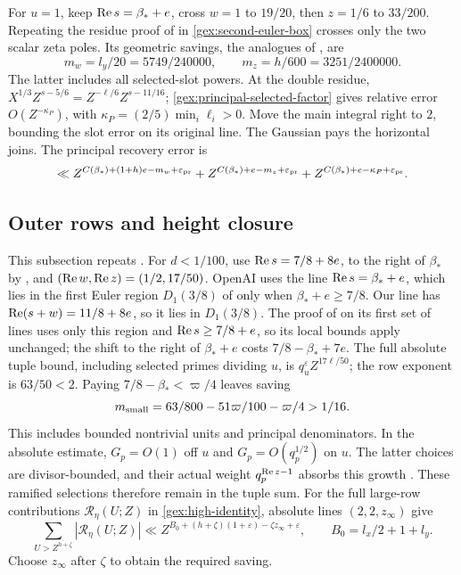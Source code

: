 For \(u=1\), keep \(\operatorname{Re} s=\beta_*+e\), cross \(w=1\) to
\(19/20\), then \(z=1/6\) to \(33/200\).
Repeating the residue proof of \cite[Lemma 10.5]{OAI26} in
\eqref{gex:second-euler-box} crosses only the two scalar zeta poles.
Its geometric savings, the analogues of \cite[(20.3)]{OAI26}, are
\[
 m_w=l_y/20=5749/240000,\qquad
 m_z=h/600=3251/2400000.
\]
The latter includes all selected-slot powers.
At the double residue,
\(X^{1/3}Z^{s-5/6}=Z^{-\ell/6}Z^{s-11/16}\);
\eqref{gex:principal-selected-factor} gives relative error
\(O(Z^{-\kappa_P})\), with
\(\kappa_P=(2/5)\min_i\ell_i>0\).
Move the main integral right to \(2\), bounding the slot error
on its original line. The Gaussian pays the horizontal joins.
The principal recovery error is
\begin{equation}\label{gex:principal-recovery-error}
 \ll Z^{C(\beta_*)+(1+h)e-m_w+\varepsilon_{\rm pr}}
 +Z^{C(\beta_*)+e-m_z+\varepsilon_{\rm pr}}
 +Z^{C(\beta_*)+e-\kappa_P+\varepsilon_{\rm pr}}.
\end{equation}

\subsection{Outer rows and height closure}

This subsection repeats \cite[Lemma 10.6 and Section 20.3]{OAI26}.
For \(d<1/100\), use \(\operatorname{Re} s=7/8+8e\), to the right of
\(\beta_*\) by \cite[Theorem~1.1]{OAI26}, and
\((\operatorname{Re} w,\operatorname{Re} z)=(1/2,17/50)\). OpenAI uses the line
\(\operatorname{Re} s=\beta_*+e\), which lies in the first Euler region
\(D_1(3/8)\) of \cite[Section 10.2]{OAI26} only when
\(\beta_*+e\ge7/8\). Our line has \(\operatorname{Re}(s+w)=11/8+8e\), so it lies in
\(D_1(3/8)\). The proof of \cite[Lemma 16.2]{OAI26} on its first set
of lines uses only this region and \(\operatorname{Re} s\ge7/8+e\), so its local
bounds apply unchanged; the shift to the right of \(\beta_*+e\) costs
\(7/8-\beta_*+7e\).
The full absolute tuple bound, including selected primes dividing
\(u\), is \(q_u^\varepsilon Z^{17\ell/50}\); the row exponent
is \(63/50<2\). Paying \(7/8-\beta_*<\varpi/4\) leaves saving
\[
 m_{\rm small}=63/800-51\varpi/100-\varpi/4>1/16.
\]
This includes bounded nontrivial units and principal denominators.
In the absolute estimate, \(G_p=O(1)\) off \(u\) and
\(G_p=O(q_p^{1/2})\) on \(u\). The latter choices are
divisor-bounded, and their actual weight
\(q_p^{\operatorname{Re} z-1}\) absorbs this growth
\cite[Lemma 16.2]{OAI26}. These ramified selections therefore
remain in the tuple sum.
For the full large-row contributions \(\mathscr R_\eta(U;Z)\)
in \eqref{gex:high-identity}, absolute lines \((2,2,z_\infty)\) give
\[
 \sum_{U>Z^{h+\zeta}}|\mathscr R_\eta(U;Z)|
 \ll Z^{B_0+(h+\zeta)(1+\varepsilon)-\zeta z_\infty+\varepsilon},
 \qquad B_0=l_x/2+1+l_y.
\]
Choose \(z_\infty\) after \(\zeta\) to obtain the required saving.

